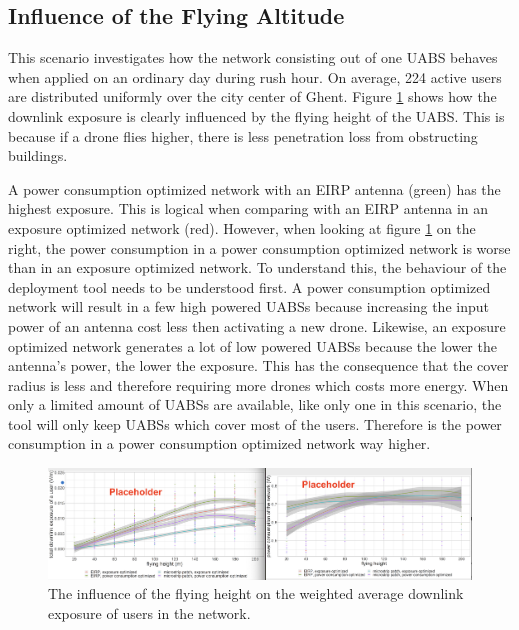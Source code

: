 \subsection{Influence of the Flying Altitude}
This scenario investigates how the network consisting out of one \gls{UABS} behaves when applied on an ordinary day during rush hour. 
On average, 224 active users are distributed uniformly over the city center of Ghent. 
Figure \ref{fig:s2a_dlAndPc} shows how the downlink exposure is clearly influenced by the flying height of the \gls{UABS}. 
This is because if a drone flies higher, there is less penetration loss from obstructing buildings.

A power consumption optimized network with an \gls{EIRP} antenna (green) has the highest exposure. 
This is logical when comparing with an EIRP antenna in an exposure optimized network (red). 
However, when looking at figure \ref{fig:s2a_dlAndPc} on the right, the power consumption in a power consumption optimized network is worse 
than in an exposure optimized network. To understand this, the behaviour of the deployment tool needs to be understood first. 
A power consumption optimized network will result in a few high powered \gls{UABS}s because increasing the input power of an antenna cost 
less then activating a new  drone. Likewise, an exposure optimized network 
generates a lot of low powered \gls{UABS}s because the lower the antenna's power, the lower the exposure. This has the consequence that the cover radius 
is less and therefore requiring more drones which costs more energy.
When only a limited amount of \gls{UABS}s are available, 
like only one in this scenario, the tool will only keep \gls{UABS}s which cover most of the users. 
Therefore is the power consumption in a power consumption optimized network way higher. 


\begin{figure}[h!]
  \includegraphics[width=\textwidth]{../results/s2/fhvsdlAndPc.png}
  \caption{The influence of the flying height on the weighted average downlink exposure of users in the network.}
  \label{fig:s2a_dlAndPc}
\end{figure}

